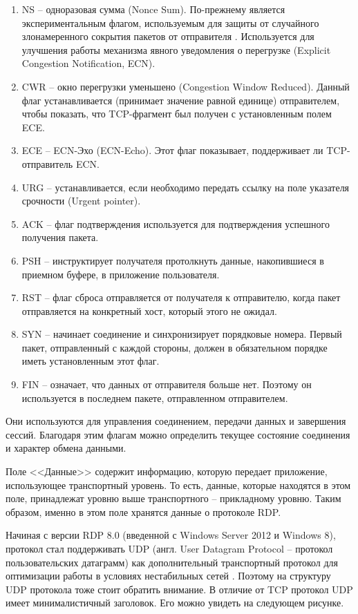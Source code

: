 \documentclass[bachelor, och, coursework]{SCWorks}
\begin{document}
\begin{enumerate}
  \item NS -- одноразовая сумма (Nonce Sum). По-прежнему является экспериментальным флагом, используемым для защиты от случайного
  злонамеренного сокрытия пакетов от отправителя \cite{tcpflags}. Используется для улучшения работы механизма явного уведомления 
  о перегрузке (Explicit Congestion Notification, ECN).
  \item CWR -- окно перегрузки уменьшено (Congestion Window Reduced). 
  Данный флаг устанавливается (принимает значение равной единице) отправителем, чтобы показать, что TCP-фрагмент был
  получен с установленным полем ECE.
  \item ECE -- ECN-Эхо (ECN-Echo). Этот флаг показывает, поддерживает ли TCP-отправитель ECN.
  \item URG -- устанавливается, если необходимо передать ссылку на поле указателя срочности (Urgent pointer).
  \item ACK -- флаг подтверждения используется для подтверждения успешного получения пакета.
  \item PSH -- инструктирует получателя протолкнуть данные, накопившиеся в приемном буфере, в приложение пользователя.
  \item RST -- флаг сброса отправляется от получателя к отправителю, когда пакет отправляется на конкретный хост, который этого не ожидал.
  \item SYN -- начинает соединение и синхронизирует порядковые номера. Первый пакет, отправленный с каждой стороны, должен в обязательном порядке иметь установленным этот флаг.
  \item FIN -- означает, что данных от отправителя больше нет. Поэтому он используется в последнем пакете, отправленном отправителем.
\end{enumerate}

Они используются для управления соединением, передачи данных и завершения сессий.
Благодаря этим флагам можно определить текущее состояние соединения и характер обмена данными.

Поле <<Данные>> содержит информацию, которую передает приложение, использующее транспортный уровень. То есть, данные, которые 
находятся в этом поле, принадлежат уровню выше транспортного -- прикладному уровню. Таким образом, именно в этом поле хранятся данные о протоколе RDP.

Начиная с версии RDP 8.0 (введенной с Windows Server 2012 и Windows 8), протокол стал поддерживать UDP (англ. User Datagram Protocol -- протокол пользовательских датаграмм)
как дополнительный транспортный протокол для оптимизации работы в условиях нестабильных сетей \cite{udpseg}. Поэтому на структуру UDP протокола тоже стоит обратить внимание.
В отличие от TCP протокол UDP имеет минималистичный заголовок. Его можно увидеть на следующем рисунке.
\end{document}
